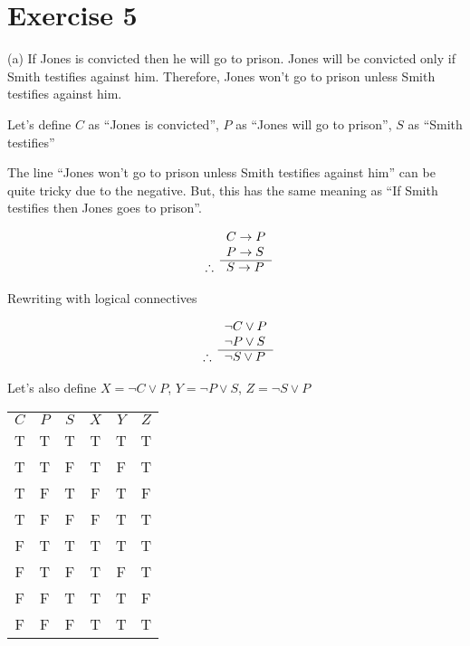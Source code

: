 \documentclass[11pt]{article}
\newcommand{\then}{\rightarrow}
\begin{document}
\section*{Exercise 5}

\noindent (a) If Jones is convicted then he will go to prison. Jones will be 
convicted only if Smith testifies against him. Therefore, Jones won't go to 
prison unless Smith testifies against him.

Let's define 
$C$ as ``Jones is convicted'',
$P$ as ``Jones will go to prison'',
$S$ as ``Smith testifies''

The line ``Jones won't go to prison unless Smith testifies against him'' can be 
quite tricky due to the negative. But, this has the same meaning as 
``If Smith testifies then Jones goes to prison''. 

\[
  \begin{array}{ r l }
               & C \then P\\
               & P \then S \\
    \cline{2-2}
    \therefore & S \then P
  \end{array}
\]

Rewriting with logical connectives

\[
  \begin{array}{ r l }
               & \neg C \vee P\\
               & \neg P \vee S \\
    \cline{2-2}
    \therefore & \neg S \vee P
  \end{array}
\]

Let's also define 
$X = \neg C \vee P$,
$Y = \neg P \vee S$,
$Z = \neg S \vee P$

\begin{center}
\begin{tabular}{ c c c c c c }
$C$ & $P$ & $S$ & $X$ & $Y$ & $Z$\\ 
T & T & T & T & T & T\\  
T & T & F & T & F & T\\
T & F & T & F & T & F\\  
T & F & F & F & T & T\\
F & T & T & T & T & T\\  
F & T & F & T & F & T\\
F & F & T & T & T & F\\  
F & F & F & T & T & T\\
\end{tabular}
\end{center}
\end{document}
